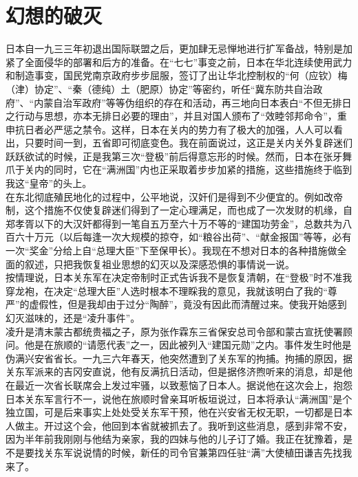 \fancyhead[RO]{} %
\fancyhead[LE]{} %
\chapter*{幻想的破灭}
\thispagestyle{empty}
日本自一九三三年初退出国际联盟之后，更加肆无忌惮地进行扩军备战，特别是加紧了全面侵华的部署和后方的准备。在“七七”事变之前，日本在华北连续使用武力和制造事变，国民党南京政府步步屈服，签订了出让华北控制权的“何（应钦）梅（津）协定”、“秦（德纯）土（肥原）协定”等密约，听任“冀东防共自治政府”、“内蒙自治军政府”等等伪组织的存在和活动，再三地向日本表白“不但无排日之行动与思想，亦本无排日必要的理由”，并且对国人颁布了“效睦邻邦命令”，重申抗日者必严惩之禁令。这样，日本在关内的势力有了极大的加强，人人可以看出，只要时间一到，五省即可彻底变色。我在前面说过，这正是关内关外复辟迷们跃跃欲试的时候，正是我第三次“登极”前后得意忘形的时候。然而，日本在张牙舞爪于关内的同时，它在“满洲国”内也正采取着步步加紧的措施，这些措施终于临到我这“皇帝”的头上。\\

在东北彻底殖民地化的过程中，公平地说，汉奸们是得到不少便宜的。例如改帝制，这个措施不仅使复辟迷们得到了一定心理满足，而也成了一次发财的机缘，自郑孝胥以下的大汉奸都得到一笔自五万至六十万不等的“建国功劳金”，总数共为八百六十万元（以后每逢一次大规模的掠夺，如“粮谷出荷”、“献金报国”等等，必有一次“奖金”分给上自“总理大臣”下至保甲长）。我现在不想对日本的各种措施做全面的叙述，只把我恢复祖业思想的幻灭以及深感恐惧的事情说一说。\\

按情理说，日本关东军在决定帝制时正式告诉我不是恢复清朝，在“登极”时不准我穿龙袍，在决定“总理大臣”人选时根本不理睬我的意见，我就该明白了我的“尊严”的虚假性，但是我却由于过分“陶醉”，竟没有因此而清醒过来。使我开始感到幻灭滋味的，还是“凌升事件”。\\

凌升是清末蒙古都统贵福之子，原为张作霖东三省保安总司令部和蒙古宣抚使署顾问。他是在旅顺的“请愿代表”之一，因此被列入“建国元勋”之内。事件发生时他是伪满兴安省省长。一九三六年春天，他突然遭到了关东军的拘捕。拘捕的原因，据关东军派来的吉冈安直说，他有反满抗日活动，但是据佟济煦听来的消息，却是他在最近一次省长联席会上发过牢骚，以致惹恼了日本人。据说他在这次会上，抱怨日本关东军言行不一，说他在旅顺时曾亲耳听板垣说过，日本将承认“满洲国”是个独立国，可是后来事实上处处受关东军干预，他在兴安省无权无职，一切都是日本人做主。开过这个会，他回到本省就被抓去了。我听到这些消息，感到非常不安，因为半年前我刚刚与他结为亲家，我的四妹与他的儿子订了婚。我正在犹豫着，是不是要找关东军说说情的时候，新任的司令官兼第四任驻“满”大使植田谦吉先找我来了。\\

